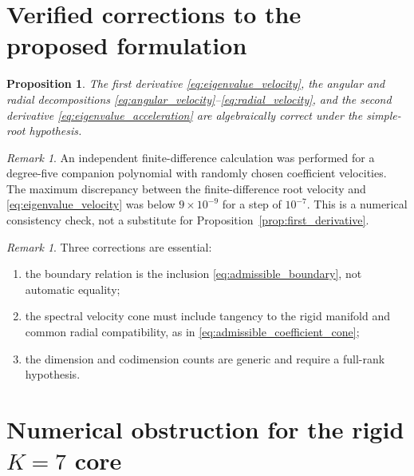 \documentclass[11pt]{amsart}
\numberwithin{equation}{section}
\theoremstyle{plain}
\newtheorem{proposition}[theorem]{Proposition}
\theoremstyle{definition}
\theoremstyle{remark}
\newtheorem{remark}[theorem]{Remark}
\begin{document}
\section{Verified corrections to the proposed formulation}
\label{sec:verified_corrections}

\begin{proposition}
\label{prop:verified_formulae}
The first derivative \eqref{eq:eigenvalue_velocity}, the angular and radial decompositions \eqref{eq:angular_velocity}--\eqref{eq:radial_velocity}, and the second derivative \eqref{eq:eigenvalue_acceleration} are algebraically correct under the simple-root hypothesis.
\end{proposition}

\begin{remark}
\label{rem:numerical_check}
An independent finite-difference calculation was performed for a degree-five companion polynomial with randomly chosen coefficient velocities.  The maximum discrepancy between the finite-difference root velocity and \eqref{eq:eigenvalue_velocity} was below $9\times10^{-9}$ for a step of $10^{-7}$.  This is a numerical consistency check, not a substitute for Proposition~\ref{prop:first_derivative}.
\end{remark}

\begin{remark}
\label{rem:corrections}
Three corrections are essential:
\begin{enumerate}
\item the boundary relation is the inclusion \eqref{eq:admissible_boundary}, not automatic equality;
\item the spectral velocity cone must include tangency to the rigid manifold and common radial compatibility, as in \eqref{eq:admissible_coefficient_cone};
\item the dimension and codimension counts are generic and require a full-rank hypothesis.
\end{enumerate}
\end{remark}


\section{Numerical obstruction for the rigid $K=7$ core}
\label{sec:K7_rigid_obstruction}
\end{document}
